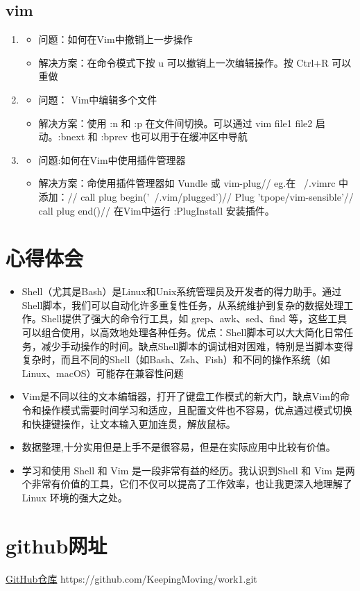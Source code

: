 \documentclass[UTF8]{ctexart}
\begin{document}
\subsection{vim}
\begin{enumerate}
\item
\begin{itemize}
\item 问题：如何在Vim中撤销上一步操作
\item 解决方案：在命令模式下按 u 可以撤销上一次编辑操作。按 Ctrl+R 可以重做
\end{itemize}
\item
\begin{itemize}
\item 问题： Vim中编辑多个文件
\item 解决方案：使用 :n 和 :p 在文件间切换。可以通过 vim file1 file2 启动。:bnext 和 :bprev 也可以用于在缓冲区中导航
\end{itemize}

\item
\begin{itemize}
\item 问题:如何在Vim中使用插件管理器
\item 解决方案：命使用插件管理器如 Vundle 或 vim-plug//
eg.在 ~/.vimrc 中添加：//
call plug begin('~/.vim/plugged')//
Plug 'tpope/vim-sensible'//
call plug end()//
在Vim中运行 :PlugInstall 安装插件。

 \end{itemize}
\end{enumerate}




  \section{心得体会}
\begin{itemize}
  \item Shell（尤其是Bash）是Linux和Unix系统管理员及开发者的得力助手。通过Shell脚本，我们可以自动化许多重复性任务，从系统维护到复杂的数据处理工作。Shell提供了强大的命令行工具，如 grep、awk、sed、find 等，这些工具可以组合使用，以高效地处理各种任务。优点：Shell脚本可以大大简化日常任务，减少手动操作的时间。缺点Shell脚本的调试相对困难，特别是当脚本变得复杂时，而且不同的Shell（如Bash、Zsh、Fish）和不同的操作系统（如Linux、macOS）可能存在兼容性问题\\
  \item Vim是不同以往的文本编辑器，打开了键盘工作模式的新大门，缺点Vim的命令和操作模式需要时间学习和适应，且配置文件也不容易，优点通过模式切换和快捷键操作，让文本输入更加连贯，解放鼠标。
   \item 数据整理,十分实用但是上手不是很容易，但是在实际应用中比较有价值。

  \item 学习和使用 Shell 和 Vim 是一段非常有益的经历。我认识到Shell 和 Vim 是两个非常有价值的工具，它们不仅可以提高了工作效率，也让我更深入地理解了 Linux 环境的强大之处。
  \end{itemize}

  \section{github网址}
\href{https://github.com/KeepingMoving/work1.git}{GitHub仓库}
https://github.com/KeepingMoving/work1.git
 
\end{document}
